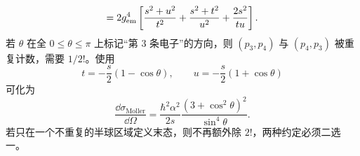\begin{derivation}
\begin{equation*}
{ =2g_{\rm em}^4\left[
 \frac{s^2+u^2}{t^2}
 +\frac{s^2+t^2}{u^2}
 +\frac{2s^2}{tu}
 \right].}
 \end{equation*}
若 $\theta$ 在全 $0\le\theta\le\pi$ 上标记“第 3 条电子”的方向，则 $(p_3,p_4)$ 与 $(p_4,p_3)$ 被重复计数，需要 $1/2!$。使用
\begin{equation*}
 t=-\frac s2(1-\cos\theta),
 \qquad
 u=-\frac s2(1+\cos\theta)
\end{equation*}
可化为
\begin{equation*}
 {
 \frac{\dd\sigma_{\mathrm{Moller}}}{\dd\Omega}
 =\frac{\hbar^2\alpha^2}{2s}
 \frac{(3+\cos^2\theta)^2}{\sin^4\theta}.}
 \end{equation*}
若只在一个不重复的半球区域定义末态，则不再额外除 $2!$，两种约定必须二选一。
\end{derivation}

